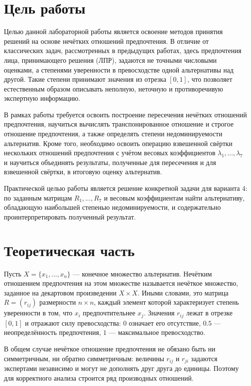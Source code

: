 
\section{Цель работы}

Целью данной лабораторной работы является освоение методов принятия решений на основе нечётких отношений предпочтения. В отличие от классических задач, рассмотренных в предыдущих работах, здесь предпочтения лица, принимающего решения (ЛПР), задаются не точными числовыми оценками, а степенями уверенности в превосходстве одной альтернативы над другой. Такие степени принимают значения из отрезка $[0,1]$, что позволяет естественным образом описывать неполную, неточную и противоречивую экспертную информацию.

В рамках работы требуется освоить построение пересечения нечётких отношений предпочтения, научиться вычислять транспонированное отношение и строгое отношение предпочтения, а также определять степени недоминируемости альтернатив. Кроме того, необходимо освоить операцию взвешенной свёртки нескольких отношений предпочтения с учётом весовых коэффициентов $\lambda_1, \ldots, \lambda_7$ и научиться объединять результаты, полученные для пересечения и для взвешенной свёртки, в итоговую оценку альтернатив.

Практической целью работы является решение конкретной задачи для варианта 4: по заданным матрицам $R_1, \ldots, R_7$ и весовым коэффициентам найти альтернативу, обладающую наибольшей степенью недоминируемости, и содержательно проинтерпретировать полученный результат.

\clearpage

\section{Теоретическая часть}

Пусть $X = \{x_1, \ldots, x_n\}$ --- конечное множество альтернатив. Нечётким отношением предпочтения на этом множестве называется нечёткое множество, заданное на декартовом произведении $X \times X$. Иными словами, это матрица $R = (r_{ij})$ размерности $n \times n$, каждый элемент которой характеризует степень уверенности в том, что $x_i$ предпочтительнее $x_j$. Значения $r_{ij}$ лежат в отрезке $[0,1]$ и отражают силу превосходства: $0$ означает его отсутствие, $0.5$ --- неопределённость предпочтения, $1$ --- максимальное превосходство.

В общем случае нечёткое отношение предпочтения не обязано быть ни симметричным, ни обратно симметричным: величины $r_{ij}$ и $r_{ji}$ задаются экспертами независимо и могут не дополнять друг друга до единицы. Поэтому для корректного анализа строится ряд производных отношений.


